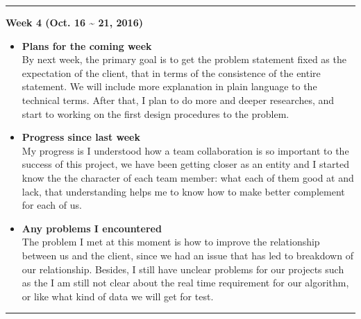 		\rule{\textwidth}{0.5pt}

		\begin{center}
			\textbf{Week 4 (Oct. 16 {\textasciitilde{}} 21, 2016)}
		\end{center}
		\begin{itemize}
			\item \textbf{Plans for the coming week}
			\\By next week, the primary goal is to get the problem statement fixed as the expectation of the client, that in terms of the consistence of the entire statement. We will include more explanation in plain language to the technical terms. After that, I plan to do more and deeper researches, and start to working on the first design procedures to the problem.\\

			\item \textbf{Progress since last week}
			\\My progress is I understood how a team collaboration is so important to the success of this project, we have been getting closer as an entity and I started know the the character of each team member: what each of them good at and lack, that understanding helps me to know how to make better complement for each of us.\\

			\item \textbf{Any problems I encountered}
			\\The problem I met at this moment is how to improve the relationship between us and the client, since we had an issue that has led to breakdown of our relationship. Besides, I still have unclear problems for our projects such as the I am still not clear about the real time requirement for our algorithm, or like what kind of data we will get for test.\\
		\end{itemize}

		\rule{\textwidth}{0.5pt}


